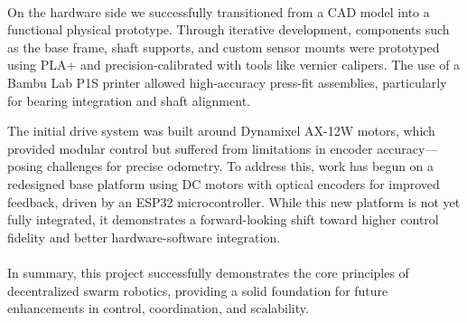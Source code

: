 \paragraph*{}
On the hardware side we successfully transitioned from a CAD model into a functional physical prototype. Through iterative development, components such as the base frame, shaft supports, and custom sensor mounts were prototyped using PLA+ and precision-calibrated with tools like vernier calipers. The use of a Bambu Lab P1S printer allowed high-accuracy press-fit assemblies, particularly for bearing integration and shaft alignment.

The initial drive system was built around Dynamixel AX-12W motors, which provided modular control but suffered from limitations in encoder accuracy—posing challenges for precise odometry. To address this, work has begun on a redesigned base platform using DC motors with optical encoders for improved feedback, driven by an ESP32 microcontroller. While this new platform is not yet fully integrated, it demonstrates a forward-looking shift toward higher control fidelity and better hardware-software integration.
\paragraph*{}
In summary, this project successfully demonstrates the core principles of decentralized swarm robotics, providing a solid foundation for future enhancements in control, coordination, and scalability.
